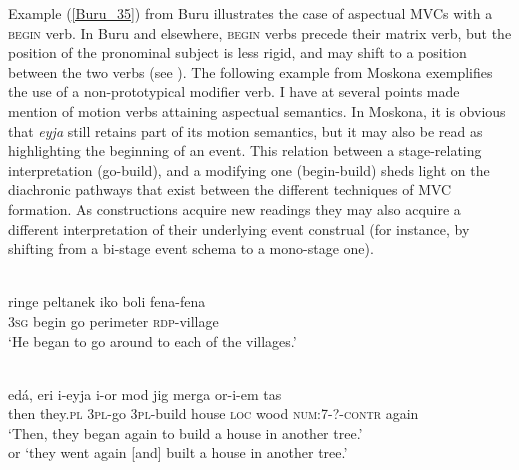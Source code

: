 Example (\ref{Buru_35}) from Buru illustrates the case of aspectual MVCs with a \textsc{begin} verb. In Buru and elsewhere, \textsc{begin} verbs precede their matrix verb, but the position of the pronominal subject is less rigid, and may shift to a position between the two verbs (see \citealt[215]{grimes1991buru}). The following example from Moskona exemplifies the use of a non-prototypical modifier verb. I have at several points made mention of motion verbs attaining aspectual semantics. In Moskona, it is obvious that \textit{eyja} still retains part of its motion semantics, but it may also be read as highlighting the beginning of an event. This relation between a stage-relating interpretation (go-build), and a modifying one (begin-build) sheds light on the diachronic pathways that exist between the different techniques of MVC formation. As constructions acquire new readings they may also acquire a different interpretation of their underlying event construal (for instance, by shifting from a bi-stage event schema to a mono-stage one).

\ea \label{Buru_35}
\\
\gll ringe peltanek iko boli fena-fena \\
3\textsc{sg} begin go perimeter \textsc{rdp}-village \\
\glft `He began to go around to each of the villages.'\\ 
\z

\ea \label{Moskona_48}
\\
\gll edá, eri i-eyja i-or mod jig merga or-i-em tas \\
then they.\textsc{pl} 3\textsc{pl}-go 3\textsc{pl}-build house \textsc{loc} wood \textsc{num}:7-?-\textsc{contr} again \\
\glft `Then, they began again to build a house in another tree.’ \\
or `they went again [and] built a house in another tree.’\\ 
\z

